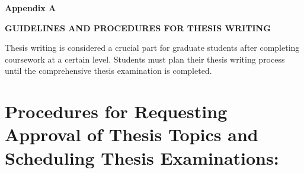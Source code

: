 \cleardoublepage
    \thispagestyle{empty}
\vspace*{\fill}
\begin{center}
    {\fontsize{18pt}{18pt} \bfseries Appendix A\par}
    {\fontsize{18pt}{18pt} \bfseries GUIDELINES AND PROCEDURES FOR THESIS WRITING\par}
\end{center}
\vspace*{\fill}
\clearpage

Thesis writing is considered a crucial part for graduate students after completing coursework at a certain level. Students must plan their thesis writing process until the comprehensive thesis examination is completed.

\section*{Procedures for Requesting Approval of Thesis Topics and Scheduling Thesis Examinations:}

